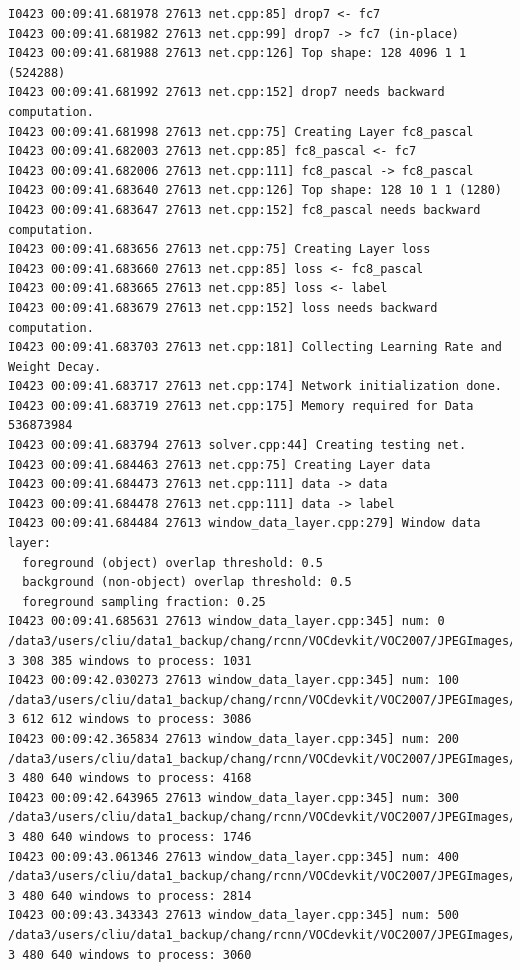 \documentclass[a4]{article}
\begin{document}
\begin{lstlisting}
I0423 00:09:41.681978 27613 net.cpp:85] drop7 <- fc7
I0423 00:09:41.681982 27613 net.cpp:99] drop7 -> fc7 (in-place)
I0423 00:09:41.681988 27613 net.cpp:126] Top shape: 128 4096 1 1 (524288)
I0423 00:09:41.681992 27613 net.cpp:152] drop7 needs backward computation.
I0423 00:09:41.681998 27613 net.cpp:75] Creating Layer fc8_pascal
I0423 00:09:41.682003 27613 net.cpp:85] fc8_pascal <- fc7
I0423 00:09:41.682006 27613 net.cpp:111] fc8_pascal -> fc8_pascal
I0423 00:09:41.683640 27613 net.cpp:126] Top shape: 128 10 1 1 (1280)
I0423 00:09:41.683647 27613 net.cpp:152] fc8_pascal needs backward computation.
I0423 00:09:41.683656 27613 net.cpp:75] Creating Layer loss
I0423 00:09:41.683660 27613 net.cpp:85] loss <- fc8_pascal
I0423 00:09:41.683665 27613 net.cpp:85] loss <- label
I0423 00:09:41.683679 27613 net.cpp:152] loss needs backward computation.
I0423 00:09:41.683703 27613 net.cpp:181] Collecting Learning Rate and Weight Decay.
I0423 00:09:41.683717 27613 net.cpp:174] Network initialization done.
I0423 00:09:41.683719 27613 net.cpp:175] Memory required for Data 536873984
I0423 00:09:41.683794 27613 solver.cpp:44] Creating testing net.
I0423 00:09:41.684463 27613 net.cpp:75] Creating Layer data
I0423 00:09:41.684473 27613 net.cpp:111] data -> data
I0423 00:09:41.684478 27613 net.cpp:111] data -> label
I0423 00:09:41.684484 27613 window_data_layer.cpp:279] Window data layer:
  foreground (object) overlap threshold: 0.5
  background (non-object) overlap threshold: 0.5
  foreground sampling fraction: 0.25
I0423 00:09:41.685631 27613 window_data_layer.cpp:345] num: 0 /data3/users/cliu/data1_backup/chang/rcnn/VOCdevkit/VOC2007/JPEGImages/COCO_val2014_000000237277.jpg 3 308 385 windows to process: 1031
I0423 00:09:42.030273 27613 window_data_layer.cpp:345] num: 100 /data3/users/cliu/data1_backup/chang/rcnn/VOCdevkit/VOC2007/JPEGImages/COCO_val2014_000000067431.jpg 3 612 612 windows to process: 3086
I0423 00:09:42.365834 27613 window_data_layer.cpp:345] num: 200 /data3/users/cliu/data1_backup/chang/rcnn/VOCdevkit/VOC2007/JPEGImages/COCO_val2014_000000134133.jpg 3 480 640 windows to process: 4168
I0423 00:09:42.643965 27613 window_data_layer.cpp:345] num: 300 /data3/users/cliu/data1_backup/chang/rcnn/VOCdevkit/VOC2007/JPEGImages/COCO_val2014_000000206049.jpg 3 480 640 windows to process: 1746
I0423 00:09:43.061346 27613 window_data_layer.cpp:345] num: 400 /data3/users/cliu/data1_backup/chang/rcnn/VOCdevkit/VOC2007/JPEGImages/COCO_val2014_000000265611.jpg 3 480 640 windows to process: 2814
I0423 00:09:43.343343 27613 window_data_layer.cpp:345] num: 500 /data3/users/cliu/data1_backup/chang/rcnn/VOCdevkit/VOC2007/JPEGImages/COCO_val2014_000000331712.jpg 3 480 640 windows to process: 3060

\end{lstlisting}
\end{document}
